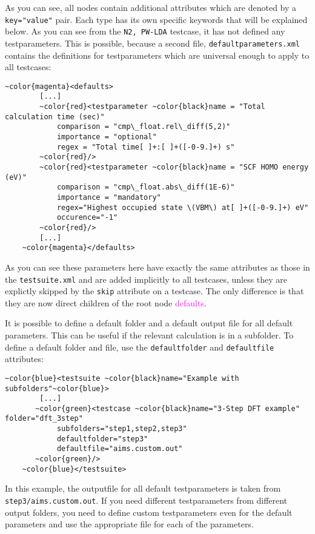 \documentclass[a4paper,12pt]{scrartcl}
\begin{document}
As you can see, all nodes contain additional attributes which are denoted by a \texttt{key="value"} pair. Each type
has its own specific keywords that will be explained below. As you can see from the \texttt{N2, PW-LDA} testcase, it
has not defined any testparameters. This is possible, because a second file, \texttt{defaultparameters.xml} contains
the definitions for testparameters which are universal enough to apply to all testcases:
\begin{Verbatim}[commandchars=~\{\},gobble=4, frame=single, framesep=2mm, label=excerpt from defaultparameters.xml,
labelposition=bottomline]
    ~color{magenta}<defaults>
        [...]
        ~color{red}<testparameter ~color{black}name = "Total calculation time (sec)"
            comparison = "cmp\_float.rel\_diff(5,2)"
            importance = "optional"
            regex = "Total time[ ]+:[ ]+([-0-9.]+) s"
        ~color{red}/>
        ~color{red}<testparameter ~color{black}name = "SCF HOMO energy (eV)"
            comparison = "cmp\_float.abs\_diff(1E-6)"
            importance = "mandatory"
            regex="Highest occupied state \(VBM\) at[ ]+([-0-9.]+) eV"
            occurence="-1"
        ~color{red}/>
        [...]
    ~color{magenta}</defaults>
\end{Verbatim}
As you can see these parameters here have exactly the same attributes as those in the \texttt{testsuite.xml} and are
added implicitly to all testcases, unless they are explictly skipped by the \texttt{skip} attribute on a testcase.
The only difference is that they are now direct children of the root node \textcolor{magenta}{defaults}.

It is possible to define a default folder and a default output file for all default parameters. This can be useful if
the relevant calculation is in a subfolder. To define a default folder and file, use the \texttt{defaultfolder} and
\texttt{defaultfile} attributes:
\begin{Verbatim}[commandchars=~\{\},gobble=4, frame=single, framesep=2mm, label=example for default output folder,
labelposition=bottomline]
    ~color{blue}<testsuite ~color{black}name="Example with subfolders"~color{blue}>
        [...]
       ~color{green}<testcase ~color{black}name="3-Step DFT example" folder="dft_3step"
            subfolders="step1,step2,step3"
            defaultfolder="step3"
            defaultfile="aims.custom.out"
       ~color{green}/>
    ~color{blue}</testsuite>
\end{Verbatim}
In this example, the outputfile for all default testparameters is taken from \\
\texttt{step3/aims.custom.out}. If you need different testparameters from different output folders, you need to
define custom testparameters even for the default parameters and use the appropriate file for each of the parameters.
\end{document}

